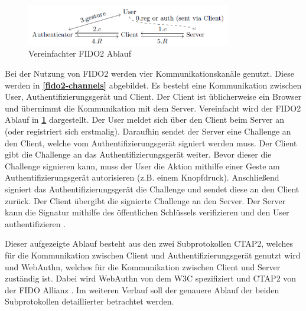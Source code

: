 \begin{figure}[h]
	\centering 
	\includegraphics[width=0.8\textwidth]{img/abbildungen/fido2_flow.png}
	\captionsetup{format=hang}
	\caption{Vereinfachter FIDO2 Ablauf \cite{barbosa2021provable}} \label{fido2-simple}
\end{figure}

Bei der Nutzung von \ac{FIDO}2 werden vier Kommunikationskanäle genutzt. Diese werden in \textbf{\ref{fido2-channels}} abgebildet. Es besteht eine Kommunikation zwischen User, Authentifizierungsgerät und Client. Der Client ist üblicherweise ein Browser und übernimmt die Kommunikation mit dem Server. Vereinfacht wird der \ac{FIDO}2 Ablauf in \textbf{\ref{fido2-simple}} dargestellt. Der User meldet sich über den Client beim Server an (oder registriert sich erstmalig). Daraufhin sendet der Server eine Challenge an den Client, welche vom Authentifizierungsgerät signiert werden muss. Der Client gibt die Challenge an das Authentifizierungsgerät weiter. Bevor dieser die Challenge signieren kann, muss der User die Aktion mithilfe einer Geste am Authentifizierungsgerät autorisieren (z.B. einem Knopfdruck). Anschließend signiert das Authentifizierungsgerät die Challenge und sendet diese an den Client zurück. Der Client übergibt die signierte Challenge an den Server. Der Server kann die Signatur mithilfe des öffentlichen Schlüssels verifizieren und den User authentifizieren \cite{lyastani2020fido2} \cite{farke2020you}.

Dieser aufgezeigte Ablauf besteht aus den zwei Subprotokollen \ac{CTAP2}, welches für die Kommunikation zwischen Client und Authentifizierungsgerät genutzt wird und WebAuthn, welches für die Kommunikation zwischen Client und Server zuständig ist. Dabei wird WebAuthn von dem \ac{W3C} spezifiziert und \ac{CTAP2} von der \ac{FIDO} Allianz \cite{farke2020you}. Im weiteren Verlauf soll der genauere Ablauf der beiden Subprotokollen detaillierter betrachtet werden.

